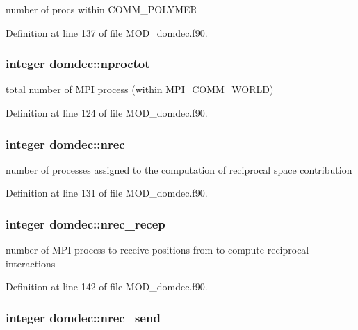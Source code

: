 number of procs within C\-O\-M\-M\-\_\-\-P\-O\-L\-Y\-M\-E\-R 



Definition at line 137 of file M\-O\-D\-\_\-domdec.\-f90.

\hypertarget{classdomdec_a77ce93de77d93f248287dfd4f89e64cc}{
\subsubsection[{nproctot}]{\setlength{\rightskip}{0pt plus 5cm}integer domdec\-::nproctot}}\label{classdomdec_a77ce93de77d93f248287dfd4f89e64cc}


total number of M\-P\-I process (within M\-P\-I\-\_\-\-C\-O\-M\-M\-\_\-\-W\-O\-R\-L\-D) 



Definition at line 124 of file M\-O\-D\-\_\-domdec.\-f90.

\hypertarget{classdomdec_a70bead05b01696a0ee6be95ecd7fd9ea}{
\subsubsection[{nrec}]{\setlength{\rightskip}{0pt plus 5cm}integer domdec\-::nrec}}\label{classdomdec_a70bead05b01696a0ee6be95ecd7fd9ea}


number of processes assigned to the computation of reciprocal space contribution 



Definition at line 131 of file M\-O\-D\-\_\-domdec.\-f90.

\hypertarget{classdomdec_a5f5bedc0c1ff6f221a8d5962dacd02ca}{
\subsubsection[{nrec\-\_\-recep}]{\setlength{\rightskip}{0pt plus 5cm}integer domdec\-::nrec\-\_\-recep}}\label{classdomdec_a5f5bedc0c1ff6f221a8d5962dacd02ca}


number of M\-P\-I process to receive positions from to compute reciprocal interactions 



Definition at line 142 of file M\-O\-D\-\_\-domdec.\-f90.

\hypertarget{classdomdec_a241ed59d98796089944cc13db0db566b}{
\subsubsection[{nrec\-\_\-send}]{\setlength{\rightskip}{0pt plus 5cm}integer domdec\-::nrec\-\_\-send}}\label{classdomdec_a241ed59d98796089944cc13db0db566b}


